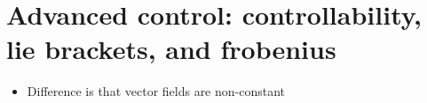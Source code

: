 
\chapter{Advanced control: controllability, lie brackets, and frobenius}

\begin{itemize}
  \item Difference is that vector fields are non-constant
\end{itemize}
